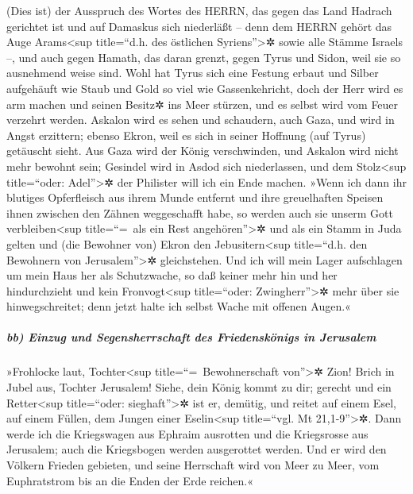  (Dies ist) der Ausspruch des Wortes des HERRN, das gegen
das Land Hadrach gerichtet ist und auf Damaskus sich niederläßt -- denn
dem HERRN gehört das Auge Arams\textless sup title=``d.h. des östlichen
Syriens''\textgreater✲ sowie alle Stämme Israels --,  und
auch gegen Hamath, das daran grenzt, gegen Tyrus und Sidon, weil sie so
ausnehmend weise sind.  Wohl hat Tyrus sich eine Festung
erbaut und Silber aufgehäuft wie Staub und Gold so viel wie
Gassenkehricht,  doch der Herr wird es arm machen und
seinen Besitz✲ ins Meer stürzen, und es selbst wird vom Feuer verzehrt
werden.  Askalon wird es sehen und schaudern, auch Gaza,
und wird in Angst erzittern; ebenso Ekron, weil es sich in seiner
Hoffnung (auf Tyrus) getäuscht sieht. Aus Gaza wird der König
verschwinden, und Askalon wird nicht mehr bewohnt sein; 
Gesindel wird in Asdod sich niederlassen, und dem Stolz\textless sup
title=``oder: Adel''\textgreater✲ der Philister will ich ein Ende
machen.  »Wenn ich dann ihr blutiges Opferfleisch aus
ihrem Munde entfernt und ihre greuelhaften Speisen ihnen zwischen den
Zähnen weggeschafft habe, so werden auch sie unserm Gott
verbleiben\textless sup title=``=~als ein Rest angehören''\textgreater✲
und als ein Stamm in Juda gelten und (die Bewohner von) Ekron den
Jebusitern\textless sup title=``d.h. den Bewohnern von
Jerusalem''\textgreater✲ gleichstehen.  Und ich will mein
Lager aufschlagen um mein Haus her als Schutzwache, so daß keiner mehr
hin und her hindurchzieht und kein Fronvogt\textless sup title=``oder:
Zwingherr''\textgreater✲ mehr über sie hinwegschreitet; denn jetzt halte
ich selbst Wache mit offenen Augen.«

\hypertarget{bb-einzug-und-segensherrschaft-des-friedenskuxf6nigs-in-jerusalem}{%
\subparagraph{bb) Einzug und Segensherrschaft des Friedenskönigs in
Jerusalem}\label{bb-einzug-und-segensherrschaft-des-friedenskuxf6nigs-in-jerusalem}}

 »Frohlocke laut, Tochter\textless sup
title=``=~Bewohnerschaft von''\textgreater✲ Zion! Brich in Jubel aus,
Tochter Jerusalem! Siehe, dein König kommt zu dir; gerecht und ein
Retter\textless sup title=``oder: sieghaft''\textgreater✲ ist er,
demütig, und reitet auf einem Esel, auf einem Füllen, dem Jungen einer
Eselin\textless sup title=``vgl. Mt 21,1-9''\textgreater✲.
 Dann werde ich die Kriegswagen aus Ephraim ausrotten und
die Kriegsrosse aus Jerusalem; auch die Kriegsbogen werden ausgerottet
werden. Und er wird den Völkern Frieden gebieten, und seine Herrschaft
wird von Meer zu Meer, vom Euphratstrom bis an die Enden der Erde
reichen.«

